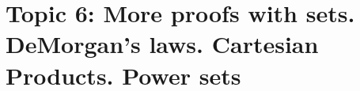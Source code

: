 \documentclass[12pt]{article}
\begin{document}


\newpage
\section[6 (\csname dateWeek6\endcsname): More sets. DeMorgan's laws. Cartesian Products. Power sets.]{Topic  6: More proofs with sets. DeMorgan's laws. Cartesian Products. Power sets}
\end{document}
